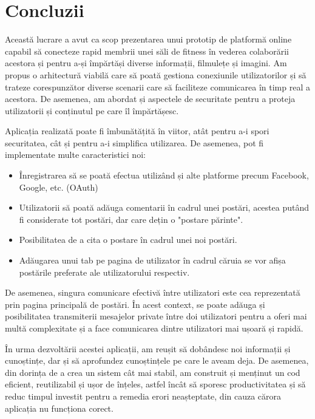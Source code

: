 \chapter{Concluzii}
Această lucrare a avut ca scop prezentarea unui prototip de platformă online capabil să conecteze rapid membrii unei săli de fitness în vederea colaborării acestora și pentru a-și împărtăși diverse informații, filmulețe și imagini.
Am propus o arhitectură viabilă care să poată gestiona conexiunile utilizatorilor și să trateze corespunzător diverse scenarii care să faciliteze comunicarea în timp real a acestora.\newline
De asemenea, am abordat și aspectele de securitate pentru a proteja utilizatorii și conținutul pe care îl împărtășesc.\newline

Aplicația realizată poate fi îmbunătățită în viitor, atât pentru a-i spori securitatea, cât și pentru a-i simplifica utilizarea. De asemenea, pot fi implementate multe caracteristici noi:
\begin{itemize}
	\item{Înregistrarea să se poată efectua utilizând și alte platforme precum Facebook, Google, etc. (OAuth)}
	\item{Utilizatorii să poată adăuga comentarii în cadrul unei postări, acestea putând fi considerate tot postări, dar care dețin o "postare părinte".}
	\item{Posibilitatea de a cita o postare în cadrul unei noi postări.}
	\item{Adăugarea unui tab pe pagina de utilizator în cadrul căruia se vor afișa postările preferate ale utilizatorului respectiv.}
	\newline
\end{itemize}

De asemenea, singura comunicare efectivă între utilizatori este cea reprezentată prin pagina principală de postări. În acest context, se poate adăuga și posibilitatea transmiterii mesajelor private între doi utilizatori pentru a oferi mai multă complexitate și a face comunicarea dintre utilizatori mai ușoară și rapidă.\newline

În urma dezvoltării acestei aplicații, am reușit să dobândesc noi informații și cunoștințe, dar și să aprofundez cunoștințele pe care le aveam deja. De asemenea, din dorința de a crea un sistem cât mai stabil, am construit și menținut un cod eficient, reutilizabil și ușor de înțeles, astfel încât să sporesc productivitatea și să reduc timpul investit pentru a remedia erori neașteptate, din cauza cărora aplicația nu funcționa corect.

\label{chap:05}